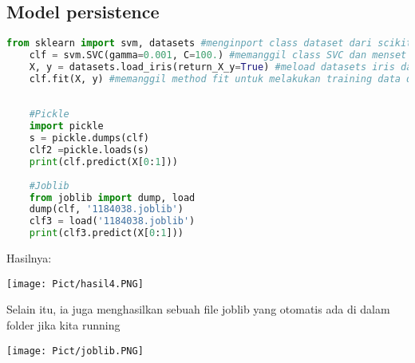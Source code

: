 \documentclass{homework}
\begin{document}
\subsection{Model persistence}
\begin{lstlisting}[language=Python]
    from sklearn import svm, datasets #menginport class dataset dari scikit learn library
    clf = svm.SVC(gamma=0.001, C=100.) #memanggil class SVC dan menset argumen constructor SVC serta ditampung di variabel clf
    X, y = datasets.load_iris(return_X_y=True) #meload datasets iris dan ditampung di variabel x untuk data dan y untuk target
    clf.fit(X, y) #memanggil method fit untuk melakukan training data dengan argumen data dan target dari datasets iris
    
    
    #Pickle
    import pickle
    s = pickle.dumps(clf)
    clf2 =pickle.loads(s)
    print(clf.predict(X[0:1]))
    
    #Joblib
    from joblib import dump, load
    dump(clf, '1184038.joblib')
    clf3 = load('1184038.joblib')
    print(clf3.predict(X[0:1]))
 \end{lstlisting}
 Hasilnya:
 \begin{center}
    \texttt{[image: Pict/hasil4.PNG]}
\end{center}
Selain itu, ia juga menghasilkan sebuah file joblib yang otomatis ada di dalam folder jika kita running
 \begin{center}
    \texttt{[image: Pict/joblib.PNG]}
\end{center}
\end{document}
